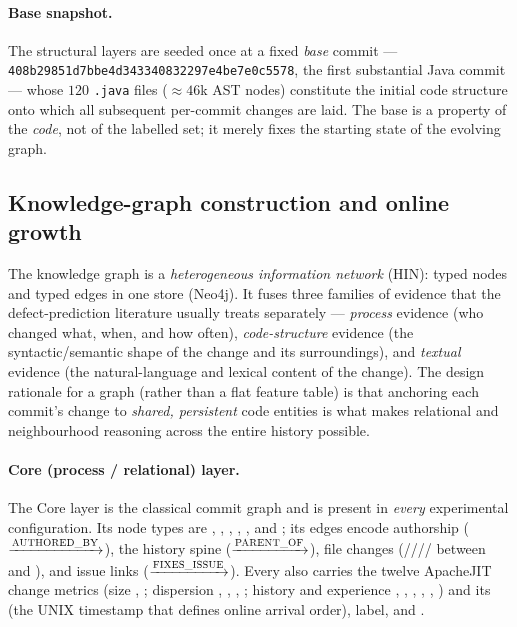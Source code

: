 	\paragraph{Base snapshot.} The structural layers are seeded once at a fixed
	\emph{base} commit --- \texttt{408b29851d7bbe4d343340832297e4be7e0c5578}, the first
	substantial Java commit --- whose $120$ \texttt{.java} files (${\approx}46$k AST
	nodes) constitute the initial code structure onto which all subsequent per-commit
	changes are laid. The base is a property of the \emph{code}, not of the labelled
	set; it merely fixes the starting state of the evolving graph.
	
	\subsection{Knowledge-graph construction and online growth}
	\label{sec:setup-kg}
	
	The knowledge graph is a \emph{heterogeneous information network} (HIN): typed nodes
	and typed edges in one store (Neo4j). It fuses three families of evidence that the
	defect-prediction literature usually treats separately --- \emph{process} evidence
	(who changed what, when, and how often), \emph{code-structure} evidence (the
	syntactic/semantic shape of the change and its surroundings), and \emph{textual}
	evidence (the natural-language and lexical content of the change). The design
	rationale for a graph (rather than a flat feature table) is that anchoring each
	commit's change to \emph{shared, persistent} code entities is what makes relational
	and neighbourhood reasoning across the entire history possible.
	
	\paragraph{Core (process / relational) layer.} The Core layer is the classical
	commit graph and is present in \emph{every} experimental configuration. Its node
	types are , , , ,
	, and ; its edges encode authorship
	($\xrightarrow{\text{\textsc{AUTHORED\_BY}}}$), the
	history spine ($\xrightarrow{\text{\textsc{PARENT\_OF}}}$),
	file changes
	(////
	between  and ), and issue links
	($\xrightarrow{\text{\textsc{FIXES\_ISSUE}}}$). Every
	 also carries the twelve ApacheJIT change metrics (size ,
	; dispersion , , , ; history and
	experience , , , , ,
	) and its  (the UNIX timestamp that defines online
	arrival order),  label, and .
	
